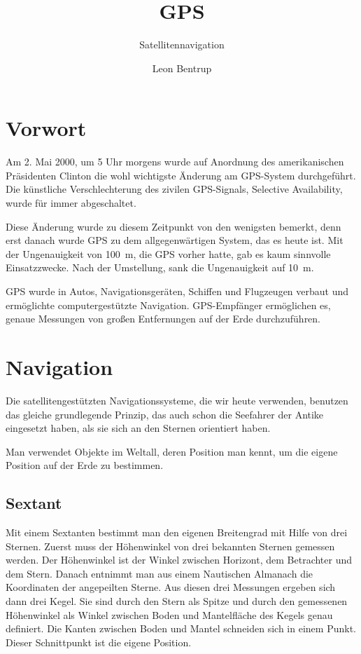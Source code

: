 \documentclass[12pt,a4paper]{scrartcl}
\author{Leon Bentrup}
\title{GPS}
\subtitle{Satellitennavigation}
\begin{document}
\maketitle
\newpage
\tableofcontents
\newpage
{}

\section{Vorwort}
Am 2. Mai 2000, um 5 Uhr morgens wurde auf Anordnung des amerikanischen Präsidenten Clinton die wohl wichtigste Änderung am GPS-System durchgeführt. Die künstliche Verschlechterung des zivilen GPS-Signals, Selective Availability, wurde für immer abgeschaltet.

Diese Änderung wurde zu diesem Zeitpunkt von den wenigsten bemerkt, denn erst danach wurde GPS zu dem allgegenwärtigen System, das es heute ist. Mit der Ungenauigkeit von \SI{100}{\meter}, die GPS vorher hatte, gab es kaum sinnvolle Einsatzzwecke. Nach der Umstellung, sank die Ungenauigkeit auf \SI{10}{\meter}.

GPS wurde in Autos, Navigationsgeräten, Schiffen und Flugzeugen verbaut und ermöglichte computergestützte Navigation. GPS-Empfänger ermöglichen es, genaue Messungen von großen Entfernungen auf der Erde durchzuführen.
\section{Navigation}
Die satellitengestützten Navigationssysteme, die wir heute verwenden, benutzen das gleiche grundlegende Prinzip, das auch schon die Seefahrer der Antike eingesetzt haben, als sie sich an den Sternen orientiert haben.

Man verwendet Objekte im Weltall, deren Position man kennt, um die eigene Position auf der Erde zu bestimmen.

\subsection{Sextant}
Mit einem Sextanten bestimmt man den eigenen Breitengrad mit Hilfe von drei Sternen.
Zuerst muss der Höhenwinkel von drei bekannten Sternen gemessen werden. Der Höhenwinkel ist der Winkel zwischen Horizont, dem Betrachter und dem Stern.
Danach entnimmt man aus einem Nautischen Almanach die Koordinaten der angepeilten Sterne. Aus diesen drei Messungen ergeben sich dann drei Kegel. Sie sind durch den Stern als Spitze und durch den gemessenen Höhenwinkel als Winkel zwischen Boden und Mantelfläche des Kegels genau definiert. Die Kanten zwischen Boden und Mantel schneiden sich in einem Punkt. Dieser Schnittpunkt ist die eigene Position.
\end{document}
